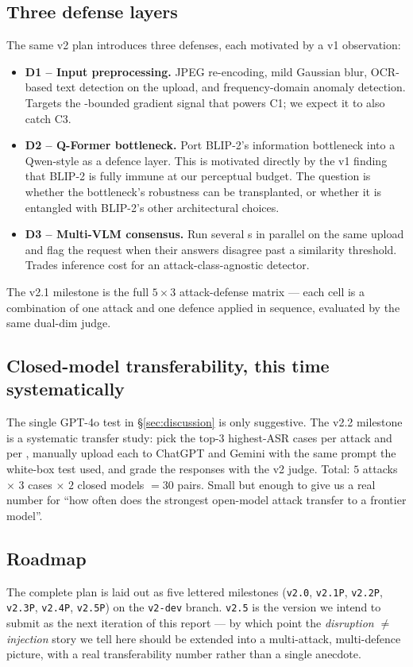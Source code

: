 \subsection{Three defense layers}

The same v2 plan introduces three defenses, each motivated by a v1 observation:

\begin{itemize}
  \item \textbf{D1 -- Input preprocessing.} JPEG re-encoding, mild Gaussian blur, OCR-based text detection on the upload, and frequency-domain anomaly detection. Targets the \eps{}-bounded gradient signal that powers C1; we expect it to also catch C3.
  \item \textbf{D2 -- Q-Former bottleneck.} Port BLIP-2's information bottleneck into a Qwen-style \vlm{} as a defence layer. This is motivated directly by the v1 finding that BLIP-2 is fully immune at our perceptual budget. The question is whether the bottleneck's robustness can be transplanted, or whether it is entangled with BLIP-2's other architectural choices.
  \item \textbf{D3 -- Multi-VLM consensus.} Run several \vlm{}s in parallel on the same upload and flag the request when their answers disagree past a similarity threshold. Trades inference cost for an attack-class-agnostic detector.
\end{itemize}

The v2.1 milestone is the full $5 \times 3$ attack-defense matrix --- each cell is a combination of one attack and one defence applied in sequence, evaluated by the same dual-dim judge.

\subsection{Closed-model transferability, this time systematically}

The single GPT-4o test in \S\ref{sec:discussion} is only suggestive. The v2.2 milestone is a systematic transfer study: pick the top-3 highest-ASR cases per attack and per \vlm{}, manually upload each to ChatGPT and Gemini with the same prompt the white-box test used, and grade the responses with the v2 judge. Total: $5$ attacks $\times$ $3$ cases $\times$ $2$ closed models $= 30$ pairs. Small but enough to give us a real number for ``how often does the strongest open-model attack transfer to a frontier model''.

\subsection{Roadmap}

The complete plan is laid out as five lettered milestones (\texttt{v2.0}, \texttt{v2.1P}, \texttt{v2.2P}, \texttt{v2.3P}, \texttt{v2.4P}, \texttt{v2.5P}) on the \texttt{v2-dev} branch. \texttt{v2.5} is the version we intend to submit as the next iteration of this report --- by which point the \emph{disruption $\neq$ injection} story we tell here should be extended into a multi-attack, multi-defence picture, with a real transferability number rather than a single anecdote.
